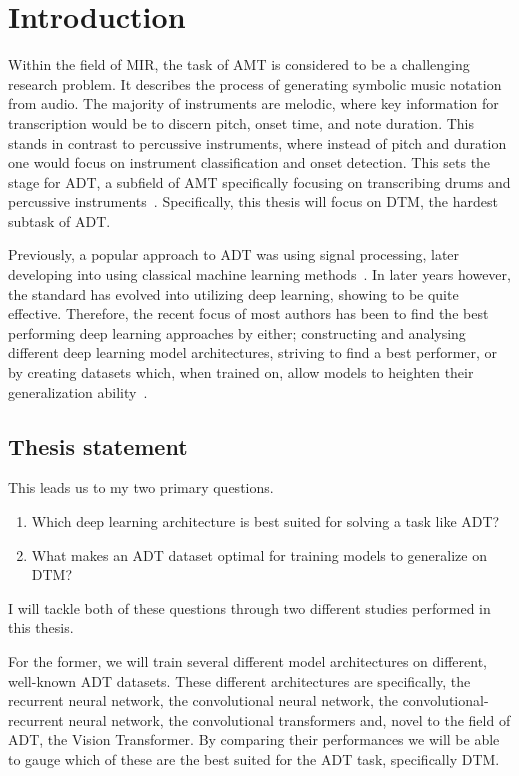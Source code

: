 \chapter{Introduction}

Within the field of \gls{MIR}, the task of \gls{AMT} is considered to be a challenging research problem. It describes the process of generating symbolic music notation from audio. The majority of instruments are melodic, where key information for transcription would be to discern pitch, onset time, and note duration. This stands in contrast to percussive instruments, where instead of pitch and duration one would focus on instrument classification and onset detection. This sets the stage for \gls{ADT}, a subfield of \gls{AMT} specifically focusing on transcribing drums and percussive instruments~\cite{8350302}. Specifically, this thesis will focus on \gls{DTM}, the hardest subtask of \gls{ADT}.

Previously, a popular approach to \gls{ADT} was using signal processing, later developing into using classical machine learning methods~\cite{8350302}. In later years however, the standard has evolved into utilizing deep learning, showing to be quite effective. Therefore, the recent focus of most authors has been to find the best performing deep learning approaches by either; constructing and analysing different deep learning model architectures, striving to find a best performer, or by creating datasets which, when trained on, allow models to heighten their generalization ability~\cite{signals4040042}.

\section{Thesis statement}

This leads us to my two primary questions. 
\begin{enumerate}
    \item Which deep learning architecture is best suited for solving a task like \gls{ADT}?
    \item What makes an \gls{ADT} dataset optimal for training models to generalize on \gls{DTM}?
\end{enumerate}
I will tackle both of these questions through two different studies performed in this thesis.

For the former, we will train several different model architectures on different, well-known \gls{ADT} datasets. These different architectures are specifically, the recurrent neural network, the convolutional neural network, the convolutional-recurrent neural network, the convolutional transformers and, novel to the field of \gls{ADT}, the Vision Transformer. By comparing their performances we will be able to gauge which of these are the best suited for the \gls{ADT} task, specifically \gls{DTM}. 

